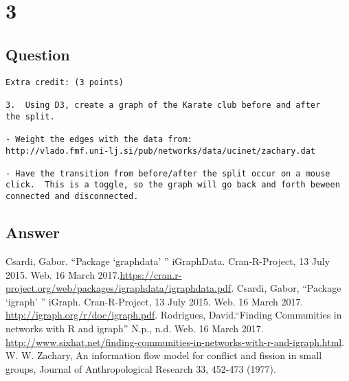 \documentclass[letterpaper,11pt]{article}
\begin{document}

\clearpage


\section*{3}

\subsection*{Question}

\begin{verbatim}
Extra credit: (3 points)

3.  Using D3, create a graph of the Karate club before and after
the split.

- Weight the edges with the data from: 
http://vlado.fmf.uni-lj.si/pub/networks/data/ucinet/zachary.dat

- Have the transition from before/after the split occur on a mouse
click.  This is a toggle, so the graph will go back and forth beween
connected and disconnected.
\end{verbatim}

\clearpage
\subsection*{Answer}


\clearpage


\begin{thebibliography}{9}
Csardi, Gabor. ``Package `graphdata' '' iGraphData. Cran-R-Project, 13 July 2015. Web. 16 March 2017.\url{https://cran.r-project.org/web/packages/igraphdata/igraphdata.pdf}.
Csardi, Gabor, ``Package `igraph' '' iGraph. Cran-R-Project, 13 July 2015. Web. 16 March 2017. \url{http://igraph.org/r/doc/igraph.pdf}.
Rodrigues, David.``Finding Communities in networks with R and igraph'' N.p., n.d. Web. 16 March 2017. \url{http://www.sixhat.net/finding-communities-in-networks-with-r-and-igraph.html}.
W. W. Zachary, An information flow model for conflict and fission in small groups, Journal of Anthropological Research 33, 452-473 (1977).
\end{thebibliography}
\end{document}
